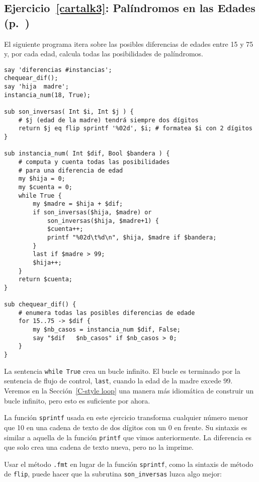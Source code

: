 \subsection{Ejercicio~\ref{cartalk3}: Palíndromos en las Edades (p.~\pageref{cartalk3})}
\label{sol_cartalk3}

El siguiente programa itera sobre las posibles diferencias de
edades entre 15 y 75 y, por cada edad, calcula todas las 
posibilidades de palíndromos.

\begin{verbatim}
say 'diferencias #instancias';
chequear_dif();
say 'hija  madre';
instancia_num(18, True);

sub son_inversas( Int $i, Int $j ) {
    # $j (edad de la madre) tendrá siempre dos dígitos
    return $j eq flip sprintf '%02d', $i; # formatea $i con 2 dígitos
}

sub instancia_num( Int $dif, Bool $bandera ) {
    # computa y cuenta todas las posibilidades 
    # para una diferencia de edad
    my $hija = 0;
    my $cuenta = 0;
    while True {
        my $madre = $hija + $dif;
        if son_inversas($hija, $madre) or 
		    son_inversas($hija, $madre+1) {
            $cuenta++;
            printf "%02d\t%d\n", $hija, $madre if $bandera;
        }
        last if $madre > 99;
        $hija++;
    }
    return $cuenta;
}

sub chequear_dif() {
    # enumera todas las posibles diferencias de edade
    for 15..75 -> $dif {
        my $nb_casos = instancia_num $dif, False;
        say "$dif   $nb_casos" if $nb_casos > 0;
    }
}
\end{verbatim}

La sentencia {\tt while True} crea un bucle infinito. El bucle 
es terminado por la sentencia de flujo de control, {\tt last}, 
cuando la edad de la madre excede 99. Veremos en la Sección~\ref{C-style loop} 
una manera más idiomática de construir un bucle infinito, pero 
esto es suficiente por ahora.

La función {\tt sprintf} usada en este ejercicio transforma cualquier 
número menor que 10 en una cadena de texto de dos dígitos con
un 0 en frente. Su sintaxis es similar a aquella de la función {\tt printf}
que vimos anteriormente. La diferencia es que solo crea una cadena de
texto nueva, pero no la imprime.

Usar el método \verb'.fmt' en lugar de la función {\tt sprintf}, 
como la sintaxis de método de {\tt flip}, puede hacer que la
subrutina \verb|son_inversas| luzca algo mejor:

